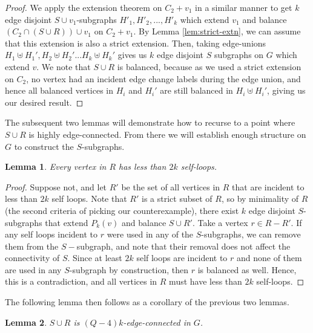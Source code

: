 \documentclass{article}
\newtheorem{lemma}{Lemma}[section]
\begin{document}
\begin{proof}
    We apply the extension theorem on $C_2+v_1$ in a similar manner to get $k$ edge disjoint $S \cup v_1$-subgraphs $H'_1, H'_2,...,H'_k$ which extend $v_1$ and balance $(C_2 \cap (S \cup R)) \cup v_1$ on $C_2+v_1$. By Lemma \ref{lem:strict-extn}, we can assume that this extension is also a strict extension. Then, taking edge-unions $H_1 \uplus H_1', H_2 \uplus H_2'...H_k \uplus H_k'$ gives us $k$ edge disjoint $S$ subgraphs on $G$ which extend $v$. We note that $S \cup R$ is balanced, because as we used a strict extension on $C_2$, no vertex had an incident edge change labels during the edge union, and hence all balanced vertices in $H_i$ and $H_i'$ are still balanced in $H_i \uplus H_i'$, giving us our desired result. 
\end{proof}


The subsequent two lemmas will demonstrate how to recurse to a point where $S \cup R$ is highly edge-connected. From there we will establish enough structure on $G$ to construct the $S$-subgraphs. 

\begin{lemma}
    Every vertex in $R$ has less than $2k$ self-loops.
\end{lemma}

\begin{proof}
    Suppose not, and let $R'$ be the set of all vertices in $R$ that are incident to less than $2k$ self loops. Note that $R'$ is a strict subset of $R$, so by minimality of $R$ (the second criteria of picking our counterexample), there exist $k$ edge disjoint $S$-subgraphs that extend $P_k(v)$ and balance $S \cup R'$. Take a vertex $r \in R-R'$. If any self loops incident to $r$ were used in any of the $S$-subgraphs, we can remove them from the $S-$subgraph, and note that their removal does not affect the connectivity of $S$. Since at least $2k$ self loops are incident to $r$ and none of them are used in any $S$-subgraph by construction, then $r$ is balanced as well. Hence, this is a contradiction, and all vertices in $R$ must have less than $2k$ self-loops.
\end{proof}

The following lemma then follows as a corollary of the previous two lemmas. 

\begin{lemma}\label{lem:Q-4-conn}
    $S \cup R$ is $(Q-4)k$-edge-connected in $G$. 
\end{lemma}
\end{document}

